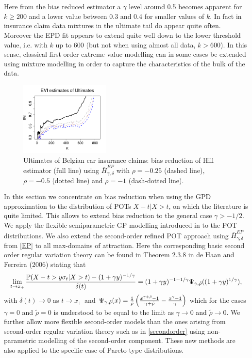 \\\\
Here from the bias reduced estimator a $\gamma$ level around 0.5 becomes apparent for $k \geq 200$ and a lower value between 0.3 and 0.4 for smaller values of $k$. In fact in insurance claim data mixtures in the ultimate tail do appear quite often. Moreover the EPD fit appears to extend quite well down to the lower threshold value, i.e. with $k$ up to 600 (but not when using almost all data, $k>600$).
In this sense, classical first order extreme value modelling can in some cases be extended using mixture modelling in order to capture the characteristics of the bulk of the data. 
\begin{figure}[!ht]
 \centering
\includegraphics[width=0.40\textwidth]{./plots/paper3/ultimates_xi.pdf} 
\caption{ Ultimates of Belgian car insurance claims: bias reduction of Hill estimator (full line) using $\bar{H}_{\gamma,\delta}^{EP}$ with $\rho=-0.25$ (dashed line), $\rho=-0.5$ (dotted line) and $\rho=-1$ (dash-dotted line).}
\label{paper3:fig1}
\end{figure}

In this section we concentrate on bias reduction when using the GPD approximation to the distribution of POTs $X-t|X>t$, on which the literature is quite limited. This allows to extend bias reduction to the general case $\gamma > -1/2$.  We apply the flexible semiparametric GP modelling introduced in \cite{tencaliec2018flexible} to the POT distributions. We also extend the second-order refined POT approach using $\bar{H}^{EP}_{\gamma,\delta}$ from \eqref{EP} to all max-domains of attraction.
Here the corresponding basic second order regular variation theory can be found in 
Theorem 2.3.8 in de Haan and Ferreira (2006) stating that
\begin{equation}
\lim_{t \to x_+}{ \mathbb{P}(X-t >y\sigma_t|X>t)- (1+\gamma y)^{-1/\gamma} \over \delta (t)} = (1+\gamma y)^{-1-1/\gamma}\Psi_{\gamma,\tilde{\rho}}((1+\gamma y)^{1/\gamma}),
\label{secondorder}
\end{equation}
with $\delta(t) \to 0$ as $t \to x_+$ and $\Psi_{\gamma,\tilde{\rho}}(x)={1 \over \tilde\rho}\left({x^{\gamma +\tilde{\rho}}-1 \over \gamma +\tilde\rho}- {x^{\gamma}-1 \over \gamma}\right)$ which for the cases $\gamma=0$ and $\tilde\rho=0$ is understood to be equal to the limit as $\gamma \to 0$ and $\tilde\rho \to 0$.
We further allow more flexible second-order models than the ones arising from second-order regular variation theory such as in \eqref{secondorder} using non-parametric modelling of the second-order component. These new methods are also applied to the specific case of Pareto-type distributions. 
\\

